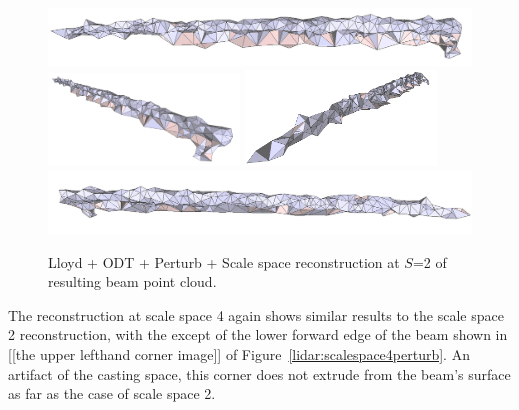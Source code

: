 \documentclass[12pt]{drexelthesis}
\begin{document}
\begin{figure}[!ht]
	\centering
		\includegraphics[width=5in]{real-lab-scans/optimizedNeat/scalespace2perturb00.png}
		\includegraphics[width=2in]{real-lab-scans/optimizedNeat/scalespace2perturb01.png}
		\includegraphics[width=2in]{real-lab-scans/optimizedNeat/scalespace2perturb02.png}
		\includegraphics[width=5in]{real-lab-scans/optimizedNeat/scalespace2perturb03.png}
		\caption[Lloyd + ODT + perturb +Scale space reconstruction at $S$=2 of segmented LiDAR data]{\centering Lloyd + ODT + Perturb + Scale space reconstruction at $S$=2 of resulting beam point cloud.}
	\label{lidar:scalespace2perturb}
\end{figure}

The reconstruction at scale space 4 again shows similar results to the scale space 2 reconstruction, with the except of the lower forward edge of the beam shown in [[the upper lefthand corner image]] of Figure~\ref{lidar:scalespace4perturb}. An artifact of the casting space, this corner does not extrude from the beam's surface as far as the case of scale space 2.
\end{document}
